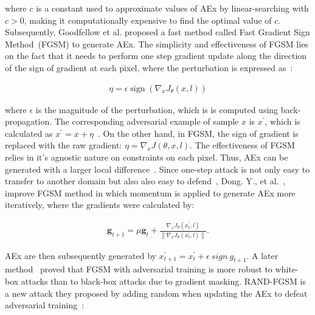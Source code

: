 \hspace*{3.5mm} where $c$ is a constant used to approximate values of AEx by linear-searching with $c > 0$, making it computationally expensive to find the optimal value of $c$. Subsequently, Goodfellow et al.\cite{goodfellow2014explaining} proposed a fast method called Fast Gradient Sign Method~(FGSM) to generate AEx. The simplicity and effectiveness of FGSM lies on the fact that it needs to perform one step gradient update along the direction of the sign of gradient at each pixel, where the perturbation is expressed as~\cite{goodfellow2014explaining}: 

\vspace{-6mm}
\begin{align}
    \eta=\epsilon \operatorname{sign}\left(\nabla_{x} J_{\theta}(x, l)\right)
    \label{eq:fgsm_eta}
\end{align}

\hspace*{3.5mm} where $\epsilon$ is the magnitude of the perturbation, which is is computed using back-propagation. The corresponding adversarial example of sample $x$ is $x^{\prime}$, which is calculated as $x^{\prime}=x+\eta$~\cite{yuan2019adversarial}. On the other hand, in FGSM, the sign of gradient is replaced with the raw gradient: $\eta=\nabla_{x} J(\theta, x, l)$. The effectiveness of FGSM relies in it's agnostic nature on constraints on each pixel. Thus, AEx can be generated with a larger local difference~\cite{yuan2019adversarial}. Since one-step attack is not only easy to transfer to another domain but also also easy to defend~\cite{yuan2019adversarial}, Dong. Y., et al.~\cite{dong2018boosting}, improve FGSM method in which momentum is applied to generate AEx more iteratively, where the gradients were calculated by:

\vspace{-6mm}
\begin{align}
    \mathbf{g}_{t+1}=\mu \mathbf{g}_{t}+\frac{\nabla_{x} J_{\theta}\left(x_{t}^{\prime}, l\right)}{\left\|\nabla_{x} J_{\theta}\left(x_{t}^{\prime}, l\right)\right\|}.
\end{align}

\hspace*{3.5mm} AEx are then subsequently generated by $x_{t+1}^{\prime}=x_{t}^{\prime} + \epsilon~sign~g_{t+1}$. A later method~\cite{tramer2017ensemble} proved that FGSM with adversarial training is more robust to white-box attacks than to black-box attacks due to gradient masking. RAND-FGSM is a new attack they proposed by adding random when updating the AEx to defeat adversarial training~\cite{yuan2019adversarial}:

